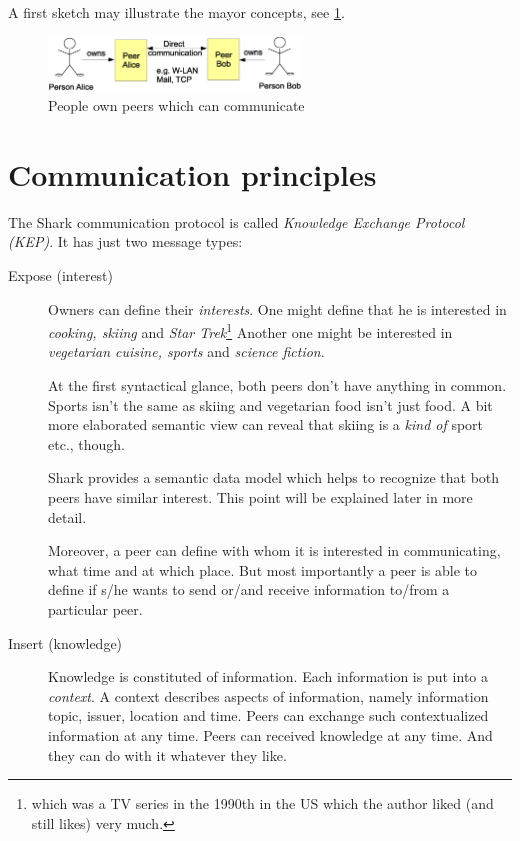A first sketch may illustrate the mayor concepts, see \ref{fig:generalConcept}.

\begin{figure}[t]
\centering
\includegraphics[width=0.60\textwidth]{generalConcept.eps}
\caption{People own peers which can communicate}
\label{fig:generalConcept}
\end{figure}

\section{Communication principles}
The Shark communication protocol is called {\it Knowledge Exchange Protocol (KEP)}. It has just two message types:

\begin{description}
    \item[Expose (interest)]
Owners can define their {\it interests}. One might define that he is interested in {\it cooking, skiing} and {\it Star Trek}\footnote{which was a TV series in the 1990th in the US which the author liked (and still likes) very much.} Another one might be interested in {\it vegetarian cuisine, sports} and {\it science fiction}. 

At the first syntactical glance, both peers don't have anything in common. Sports isn't the same as skiing and vegetarian food isn't just food. A bit more elaborated semantic view can reveal that skiing is a {\it kind of} sport etc., though. 

Shark provides a semantic data model which helps to recognize that both peers have similar interest. This point will be explained later in more detail.

Moreover, a peer can define with whom it is interested in communicating, what time and at which place. But most importantly a peer is able to define if s/he wants to send or/and receive information to/from a particular peer.

    \item[Insert (knowledge)]
Knowledge is constituted of information. Each information is put into a {\it context}. A context describes aspects of information, namely information topic, issuer, location and time. Peers can exchange such contextualized information at any time. Peers can received knowledge at any time. And they can do with it whatever they like.
\end{description}

